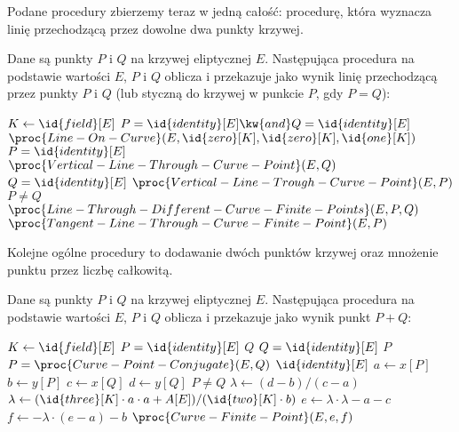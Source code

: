 \noindent
Podane procedury zbierzemy teraz w jedną całość:
procedurę, która wyznacza linię przechodzącą przez dowolne dwa punkty krzywej.

\begin{algorithm}
Dane są punkty $P$ i $Q$ na krzywej eliptycznej $E$.
Następująca procedura
na podstawie wartości $E$, $P$ i $Q$
oblicza i przekazuje jako wynik
linię przechodzącą przez punkty $P$ i $Q$
(lub styczną do krzywej w punkcie $P$, gdy $P = Q$):

\begin{codebox}
\li $K \gets \id{field}[E]$
\li \If $P = \id{identity}[E] \kw{ and } Q = \id{identity}[E]$
\li     \Then
            \Return $\proc{Line-On-Curve}(E, \id{zero}[K], \id{zero}[K], \id{one}[K])$
        \End
\li \If $P = \id{identity}[E]$
\li     \Then
            \Return $\proc{Vertical-Line-Through-Curve-Point}(E, Q)$
        \End
\li \If $Q = \id{identity}[E]$
\li     \Then
            \Return $\proc{Vertical-Line-Trough-Curve-Point}(E, P)$
        \End
\li \If $P \neq Q$
\li     \Then
            \Return $\proc{Line-Through-Different-Curve-Finite-Points}(E, P, Q)$
\li     \Else
            \Return $\proc{Tangent-Line-Through-Curve-Finite-Point}(E, P)$
        \End
\end{codebox}
\end{algorithm}

\noindent
Kolejne ogólne procedury to dodawanie dwóch punktów krzywej
oraz mnożenie punktu przez liczbę całkowitą.

\begin{algorithm}
Dane są punkty $P$ i $Q$ na krzywej eliptycznej $E$.
Następująca procedura
na podstawie wartości $E$, $P$ i $Q$
oblicza i przekazuje jako wynik
punkt $P + Q$:

\begin{codebox}
\li $K \gets \id{field}[E]$
\li \If $P = \id{identity}[E]$
\li     \Then
            \Return $Q$
        \End
\li \If $Q = \id{identity}[E]$
\li     \Then
            \Return $P$
        \End
\li \If $P = \proc{Curve-Point-Conjugate}(E, Q)$
\li     \Then
            \Return $\id{identity}[E]$
        \End
\li $a \gets x[P]$
\li $b \gets y[P]$
\li $c \gets x[Q]$
\li $d \gets y[Q]$
\li \If $P \neq Q$
\li     \Then
            $\lambda \gets (d - b)/(c - a)$
\li     \Else
            $\lambda \gets (\id{three}[K]\cdot a\cdot a + A[E])/(\id{two}[K]\cdot b)$
        \End
\li $e \gets \lambda\cdot\lambda - a - c$
\li $f \gets -\lambda\cdot(e - a) - b$
\li \Return $\proc{Curve-Finite-Point}(E, e, f)$
\end{codebox}
\end{algorithm}

